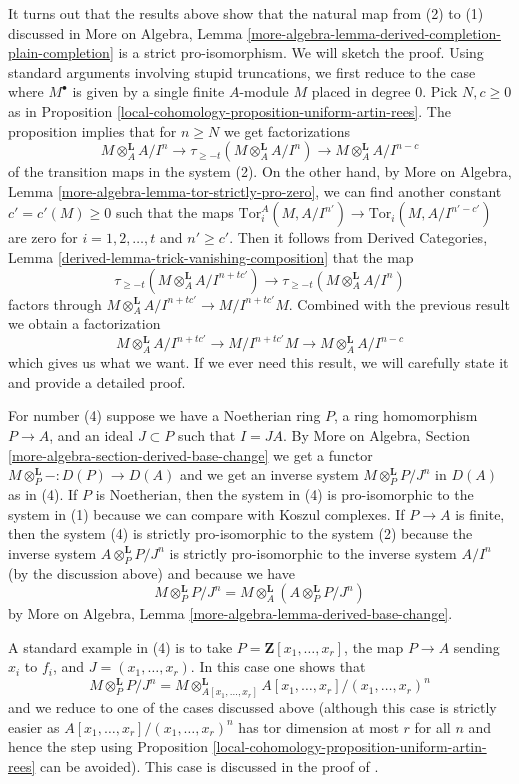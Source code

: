 \begin{remark}
\medskip\noindent
It turns out that the results above show that the natural map from
(2) to (1) discussed in More on Algebra, Lemma
\ref{more-algebra-lemma-derived-completion-plain-completion}
is a strict pro-isomorphism. We will sketch the proof.
Using standard arguments involving stupid truncations, we first reduce
to the case where $M^\bullet$ is given by a single finite $A$-module
$M$ placed in degree $0$. Pick $N, c \geq 0$ as in
Proposition \ref{local-cohomology-proposition-uniform-artin-rees}.
The proposition implies that for $n \geq N$ we get factorizations
$$
M \otimes_A^\mathbf{L} A/I^n
\to
\tau_{\geq -t}(M \otimes_A^\mathbf{L} A/I^n)
\to
M \otimes_A^\mathbf{L} A/I^{n - c}
$$
of the transition maps in the system (2). On the other hand, by
More on Algebra, Lemma \ref{more-algebra-lemma-tor-strictly-pro-zero},
we can find another constant $c' = c'(M) \geq 0$ such that the maps
$\text{Tor}_i^A(M, A/I^{n'}) \to \text{Tor}_i(M, A/I^{n' - c'})$
are zero for $i = 1, 2, \ldots, t$ and $n' \geq c'$. Then it follows from
Derived Categories, Lemma \ref{derived-lemma-trick-vanishing-composition}
that the map
$$
\tau_{\geq -t}(M \otimes_A^\mathbf{L} A/I^{n + tc'})
\to
\tau_{\geq -t}(M \otimes_A^\mathbf{L} A/I^n)
$$
factors through $M \otimes_A^\mathbf{L}A/I^{n + tc'} \to M/I^{n + tc'}M$.
Combined with the previous result we obtain a factorization
$$
M \otimes_A^\mathbf{L}A/I^{n + tc'} \to M/I^{n + tc'}M
\to M \otimes_A^\mathbf{L} A/I^{n - c}
$$
which gives us what we want. If we ever need this result, we will carefully
state it and provide a detailed proof.

\medskip\noindent
For number (4) suppose we have a Noetherian ring $P$,
a ring homomorphism $P \to A$, and an ideal $J \subset P$ such that $I = JA$.
By More on Algebra, Section \ref{more-algebra-section-derived-base-change}
we get a functor $M \otimes_P^\mathbf{L} - : D(P) \to D(A)$ and we get
an inverse system $M \otimes_P^\mathbf{L} P/J^n$ in $D(A)$ as in (4).
If $P$ is Noetherian, then the system in (4) is pro-isomorphic
to the system in (1) because we can compare with Koszul complexes.
If $P \to A$ is finite, then the system (4) is strictly pro-isomorphic
to the system (2) because the inverse system $A \otimes_P^\mathbf{L} P/J^n$
is strictly pro-isomorphic to the inverse system $A/I^n$
(by the discussion above) and because we have
$$
M \otimes_P^\mathbf{L} P/J^n = M \otimes_A^\mathbf{L}
(A \otimes_P^\mathbf{L} P/J^n)
$$
by More on Algebra, Lemma \ref{more-algebra-lemma-derived-base-change}.

\medskip\noindent
A standard example in (4) is to take $P = \mathbf{Z}[x_1, \ldots, x_r]$,
the map $P \to A$ sending $x_i$ to $f_i$, and $J = (x_1, \ldots, x_r)$.
In this case one shows that
$$
M \otimes_P^\mathbf{L} P/J^n =
M \otimes_{A[x_1, \ldots, x_r]}^\mathbf{L}
A[x_1, \ldots, x_r]/(x_1, \ldots, x_r)^n
$$
and we reduce to one of the cases discussed above (although this case
is strictly easier as $A[x_1, \ldots, x_r]/(x_1, \ldots, x_r)^n$ has
tor dimension at most $r$ for all $n$ and hence the step using
Proposition \ref{local-cohomology-proposition-uniform-artin-rees} can be avoided).
This case is discussed in the proof of \cite[Proposition 3.5.1]{BS}.
\end{remark}

